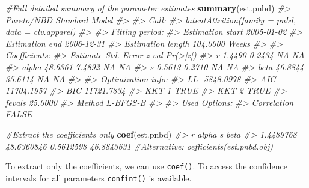 \documentclass[
]{article}
\newenvironment{Shaded}{\begin{snugshade}}{\end{snugshade}}
\newcommand{\CommentTok}[1]{\textcolor[rgb]{0.56,0.35,0.01}{\textit{#1}}}
\newcommand{\FunctionTok}[1]{\textcolor[rgb]{0.13,0.29,0.53}{\textbf{#1}}}
\newcommand{\NormalTok}[1]{#1}
\begin{document}
\begin{Shaded}
\begin{Highlighting}[]
\CommentTok{\#Full detailed summary of the parameter estimates}
\FunctionTok{summary}\NormalTok{(est.pnbd)}
\CommentTok{\#\textgreater{} Pareto/NBD Standard  Model }
\CommentTok{\#\textgreater{} }
\CommentTok{\#\textgreater{} Call:}
\CommentTok{\#\textgreater{} latentAttrition(family = pnbd, data = clv.apparel)}
\CommentTok{\#\textgreater{} }
\CommentTok{\#\textgreater{} Fitting period:                                }
\CommentTok{\#\textgreater{} Estimation start  2005{-}01{-}02    }
\CommentTok{\#\textgreater{} Estimation end    2006{-}12{-}31    }
\CommentTok{\#\textgreater{} Estimation length 104.0000 Weeks}
\CommentTok{\#\textgreater{} }
\CommentTok{\#\textgreater{} Coefficients:}
\CommentTok{\#\textgreater{}       Estimate Std. Error z{-}val Pr(\textgreater{}|z|)}
\CommentTok{\#\textgreater{} r       1.4490     0.2434    NA       NA}
\CommentTok{\#\textgreater{} alpha  48.6361     7.4892    NA       NA}
\CommentTok{\#\textgreater{} s       0.5613     0.2710    NA       NA}
\CommentTok{\#\textgreater{} beta   46.8844    35.6114    NA       NA}
\CommentTok{\#\textgreater{} }
\CommentTok{\#\textgreater{} Optimization info:                 }
\CommentTok{\#\textgreater{} LL     {-}5848.0978}
\CommentTok{\#\textgreater{} AIC    11704.1957}
\CommentTok{\#\textgreater{} BIC    11721.7834}
\CommentTok{\#\textgreater{} KKT 1  TRUE      }
\CommentTok{\#\textgreater{} KKT 2  TRUE      }
\CommentTok{\#\textgreater{} fevals 25.0000   }
\CommentTok{\#\textgreater{} Method L{-}BFGS{-}B  }
\CommentTok{\#\textgreater{} }
\CommentTok{\#\textgreater{} Used Options:                 }
\CommentTok{\#\textgreater{} Correlation FALSE}

\CommentTok{\#Extract the coefficients only}
\FunctionTok{coef}\NormalTok{(est.pnbd)}
\CommentTok{\#\textgreater{}          r      alpha          s       beta }
\CommentTok{\#\textgreater{}  1.4489768 48.6360846  0.5612598 46.8843631}
\CommentTok{\#Alternative: oefficients(est.pnbd.obj)}
\end{Highlighting}
\end{Shaded}

To extract only the coefficients, we can use \texttt{coef()}. To access
the confidence intervals for all parameters \texttt{confint()} is
available.
\end{document}

